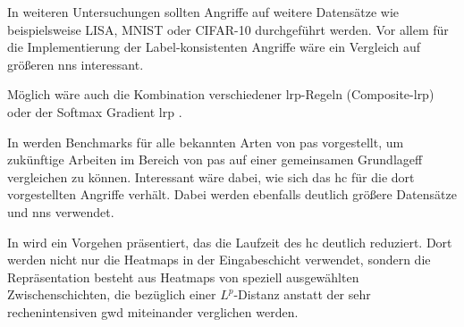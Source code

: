 \documentclass[twoside, 12pt,a4paper]{book}
\numberwithin{equation}{section}
\begin{document}
	\noindent In weiteren Untersuchungen sollten Angriffe auf weitere Datensätze wie beispielsweise LISA, MNIST oder CIFAR-10 durchgeführt werden. Vor allem für die Implementierung der Label-konsistenten Angriffe wäre ein Vergleich auf größeren \acp{nn} interessant.
	
	\noindent Möglich wäre auch die Kombination verschiedener \ac{lrp}-Regeln (Composite-\ac{lrp}) oder der Softmax Gradient \ac{lrp} \cite{sglrp}.
	
	\noindent In \cite{toxic} werden Benchmarks für alle bekannten Arten von \acp{pa} vorgestellt, um zukünftige Arbeiten im Bereich von \acp{pa} auf einer gemeinsamen Grundlageff vergleichen zu können. Interessant wäre dabei, wie sich das \ac{hc} für die dort vorgestellten Angriffe verhält. Dabei werden ebenfalls deutlich größere Datensätze und \acp{nn} verwendet.
	
	\noindent In \cite{findingandremoving} wird ein Vorgehen präsentiert, das die Laufzeit des \ac{hc} deutlich reduziert. Dort werden nicht nur die Heatmaps in der Eingabeschicht verwendet, sondern die Repräsentation besteht aus Heatmaps von speziell ausgewählten Zwischenschichten, die bezüglich einer $L^p$-Distanz anstatt der sehr rechenintensiven \ac{gwd} miteinander verglichen werden. 
	
	
	
	
	
	
	
	
\end{document}
